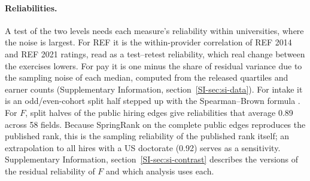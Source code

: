 \documentclass[11pt]{article}
\newcommand{\SIsec}[1]{Supplementary Information, section~\ref{SI-#1}}
\begin{document}
\paragraph{Reliabilities.} A test of the two levels needs each measure's reliability within universities, where the
noise is largest. For REF it is the within-provider correlation of REF 2014 and REF 2021 ratings, read as a
test--retest reliability, which real change between the exercises lowers. For pay it is one minus the share of
residual variance due to the sampling noise of each median, computed from the released quartiles and earner counts
(\SIsec{sec:si-data}). For intake it is an odd/even-cohort split half stepped up with the Spearman--Brown formula
\citep{spearman1910correlation, brown1910some}. For $F$, split halves of the public hiring edges give reliabilities
that average 0.89 across 58 fields. Because SpringRank on the complete public edges reproduces the published rank, this
is the sampling reliability of the published rank itself; an extrapolation to all hires with a US doctorate (0.92)
serves as a sensitivity. \SIsec{sec:si-contrast} describes the versions of the residual reliability of $F$ and which
analysis uses each.
\end{document}
